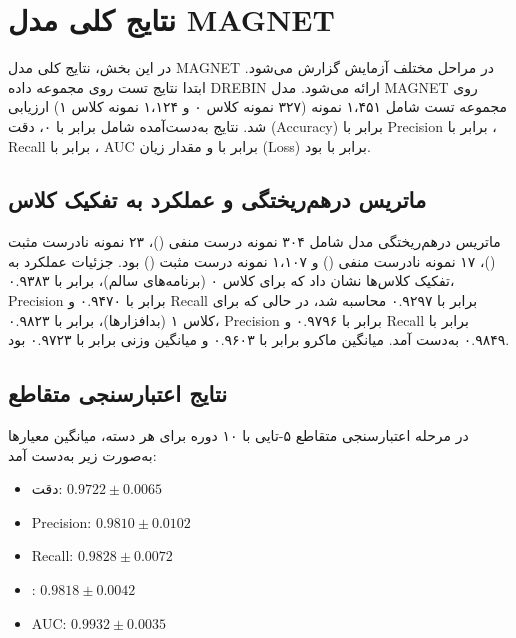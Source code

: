 \section{نتایج کلی مدل MAGNET}
در این بخش، نتایج کلی مدل MAGNET در مراحل مختلف آزمایش گزارش می‌شود. ابتدا نتایج تست روی مجموعه داده DREBIN \cite{Drebin} ارائه می‌شود. مدل MAGNET روی مجموعه تست شامل ۱،۴۵۱ نمونه (۳۲۷ نمونه کلاس ۰ و ۱،۱۲۴ نمونه کلاس ۱) ارزیابی شد. نتایج به‌دست‌آمده شامل  برابر با ۰، دقت (Accuracy) برابر با  Precision برابر با ، Recall برابر با ، AUC برابر با  و مقدار زیان (Loss) برابر با  بود.

\subsection{ماتریس درهم‌ریختگی و عملکرد به تفکیک کلاس}
ماتریس درهم‌ریختگی مدل شامل ۳۰۴ نمونه درست منفی ()، ۲۳ نمونه نادرست مثبت ()، ۱۷ نمونه نادرست منفی () و ۱،۱۰۷ نمونه درست مثبت () بود. جزئیات عملکرد به تفکیک کلاس‌ها نشان داد که برای کلاس ۰ (برنامه‌های سالم)،  برابر با ۰.۹۳۸۳، Precision برابر با ۰.۹۴۷۰ و Recall برابر با ۰.۹۲۹۷ محاسبه شد، در حالی که برای کلاس ۱ (بدافزارها)،  برابر با ۰.۹۸۲۳، Precision برابر با ۰.۹۷۹۶ و Recall برابر با ۰.۹۸۴۹ به‌دست آمد. میانگین ماکرو  برابر با ۰.۹۶۰۳ و میانگین وزنی  برابر با ۰.۹۷۲۳ بود.

\subsection{نتایج اعتبارسنجی متقاطع}
در مرحله اعتبارسنجی متقاطع ۵-تایی با ۱۰ دوره برای هر دسته، میانگین معیارها به‌صورت زیر به‌دست آمد:
\begin{itemize}
    \item دقت: $0.9722 \pm 0.0065$
    \item Precision: $0.9810 \pm 0.0102$
    \item Recall: $0.9828 \pm 0.0072$
    \item {}: $0.9818 \pm 0.0042$
    \item AUC: $0.9932 \pm 0.0035$
\end{itemize}

